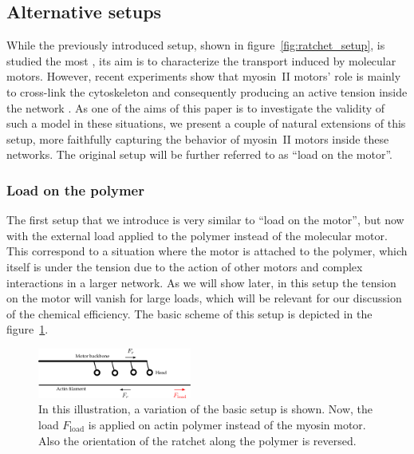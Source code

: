 \documentclass[aps,pre,twocolumn,showpacs,showkeys,superscriptaddress,floatfix]{revtex4-1}
\begin{document}
\subsection{Alternative setups}
\label{sec:other_setups}
While the previously introduced setup, shown in figure~\ref{fig:ratchet_setup}, is studied the most \cite{reimann2002brownian,astumian1994fluctuation,finer1994single,julicher1997modeling,kishino1988force,peskin1995correlation,saito1994movement},
its aim is to characterize the transport induced by molecular motors.
However, recent experiments show that myosin~II motors' role is mainly to cross-link the cytoskeleton \cite{ma2012nonmuscle}
and consequently producing an active tension inside the network \cite{chugh2017actin,monier2010actomyosin}.
As one of the aims of this paper is to investigate the validity of such a model in these situations, 
we present a couple of natural extensions of this setup, more faithfully capturing the behavior of myosin~II motors inside these networks.
The original setup will be further referred to as ``load on the motor''.

\subsubsection{Load on the polymer}
\label{sec:load_on_polymer}
The first setup that we introduce is very similar to ``load on the motor'', 
but now with the external load applied to the polymer instead of the molecular motor. 
This correspond to a situation where the motor is attached to the polymer, which itself is under the tension due to the action of other motors and complex interactions in a larger network.
As we will show later, in this setup the tension on the motor will vanish for large loads, which will be relevant for our discussion of the chemical efficiency. 
The basic scheme of this setup is depicted in the figure~\ref{fig:load_on_polymer setup}.
\begin{figure}[t]
\centering
\includegraphics[width=0.45\textwidth,height=!]{load_on_polymer_illustration}
\caption{
\label{fig:load_on_polymer setup}
In this illustration, a variation of the basic setup is shown.  
Now, the load $F_\text{load}$ is applied on actin polymer instead of the myosin motor. Also the orientation of the ratchet along the polymer is reversed.
} 
\end{figure}
\end{document}
